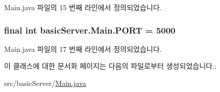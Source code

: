 Main.\+java 파일의 15 번째 라인에서 정의되었습니다.

\hypertarget{classbasic_server_1_1_main_af83ee27a3ec7ae49bcfed0bc78bd32ca}{
\subsubsection[{P\+O\+R\+T}]{\setlength{\rightskip}{0pt plus 5cm}final int basic\+Server.\+Main.\+P\+O\+R\+T = 5000\hspace{0.3cm}{\ttfamily [static]}}}\label{classbasic_server_1_1_main_af83ee27a3ec7ae49bcfed0bc78bd32ca}


Main.\+java 파일의 17 번째 라인에서 정의되었습니다.



이 클래스에 대한 문서화 페이지는 다음의 파일로부터 생성되었습니다.\+:\begin{DoxyCompactItemize}
\item 
src/basic\+Server/\hyperlink{_main_8java}{Main.\+java}\end{DoxyCompactItemize}
